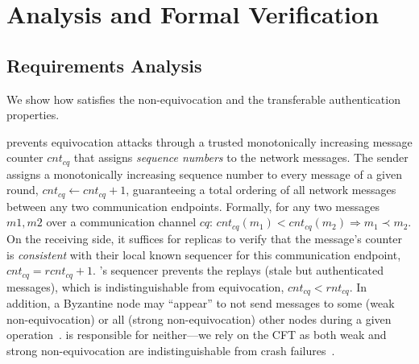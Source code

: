 \section{\projecttitle{} Analysis and Formal Verification}
\label{sec:theory}

\subsection{Requirements Analysis}
We show how \projecttitle{} satisfies the non-equivocation and the transferable authentication properties.

\projecttitle{} prevents equivocation attacks through a trusted monotonically increasing message counter $cnt_{cq}$ that assigns \emph{sequence numbers} to the network messages. The sender assigns a monotonically increasing sequence number to every message of a given round, $cnt_{cq} \leftarrow cnt_{cq} +1$, guaranteeing a total ordering of all network messages between any two communication endpoints. Formally, for any two messages $m1,m2$ over a communication channel $cq$: $cnt_{cq}(m_{1}) < cnt_{cq}(m_2) \Longrightarrow  m_{1} \prec m_2$. 
On the receiving side, it suffices for replicas to verify that the message's counter is \emph{consistent} with their local known sequencer for this communication endpoint, $cnt_{cq} = rcnt_{cq} +1$. %
\projecttitle{}'s sequencer prevents the replays (stale but authenticated messages), which is indistinguishable from equivocation, $cnt_{cq} < rnt_{cq}$. In addition, a Byzantine node may ``appear'' to not send messages to some (weak non-equivocation) or all (strong non-equivocation) other nodes during a given operation~\cite{madsen2020}. \projecttitle{} is responsible for neither---we rely on the CFT as both weak and strong non-equivocation are indistinguishable from crash failures~\cite{madsen2020}.


